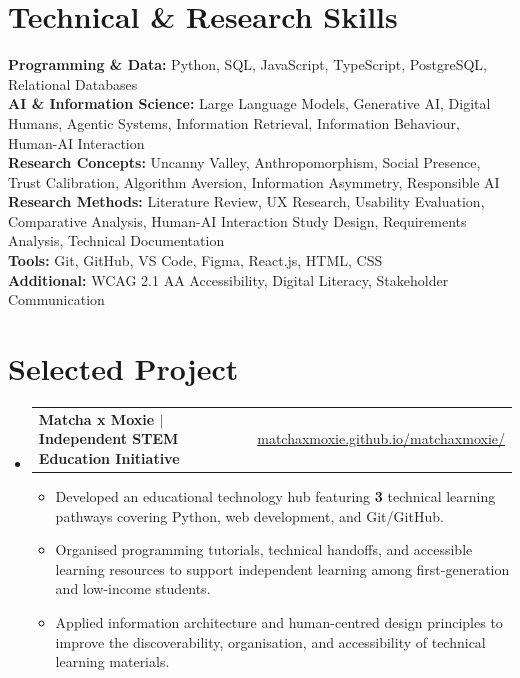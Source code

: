 \documentclass[letterpaper,10pt]{article}
\makeatletter
\newcommand{\resumeRole}[2]{%
  \item
    \begin{tabular*}{\textwidth}[t]{l@{\extracolsep{\fill}}r}
      \textbf{#1} & {#2} \\
    \end{tabular*}%
}
\newcommand{\resumeItem}[1]{\item{#1}}
\newcommand{\resumeSubHeadingListStart}{%
  \begin{itemize}[leftmargin=0pt, label={}, itemsep=1.1pt, parsep=0pt, topsep=0.3pt, partopsep=0pt]
}
\newcommand{\resumeSubHeadingListEnd}{\end{itemize}}
\newcommand{\resumeItemListStart}{%
  \begin{itemize}[leftmargin=0.28in, labelsep=4.96pt, labelindent=0.10in, itemindent=0pt, labelwidth=8pt, align=left, label=\textbullet, itemsep=0.15pt, parsep=0pt, topsep=0.15pt, partopsep=0pt]
  \fontsize{10}{10.4}\selectfont
}
\newcommand{\resumeItemListEnd}{\end{itemize}}
\newcommand{\skillline}[2]{\textbf{#1:} #2}
\makeatother
\begin{document}
\section{Technical \& Research Skills}
\skillline{Programming \& Data}{Python, SQL, JavaScript, TypeScript, PostgreSQL, Relational Databases}\\[0.5pt]
\skillline{AI \& Information Science}{Large Language Models, Generative AI, Digital Humans, Agentic Systems, Information Retrieval, Information Behaviour, Human-AI Interaction}\\[0.5pt]
\skillline{Research Concepts}{Uncanny Valley, Anthropomorphism, Social Presence, Trust Calibration, Algorithm Aversion, Information Asymmetry, Responsible AI}\\[0.5pt]
\skillline{Research Methods}{Literature Review, UX Research, Usability Evaluation, Comparative Analysis, Human-AI Interaction Study Design, Requirements Analysis, Technical Documentation}\\[0.5pt]
\skillline{Tools}{Git, GitHub, VS Code, Figma, React.js, HTML, CSS}\\[0.5pt]
\skillline{Additional}{WCAG 2.1 AA Accessibility, Digital Literacy, Stakeholder Communication}

\section{Selected Project}
\resumeSubHeadingListStart
  \resumeRole{Matcha x Moxie $\vert$ Independent STEM Education Initiative}{\href{https://matchaxmoxie.github.io/matchaxmoxie/}{matchaxmoxie.github.io/matchaxmoxie/}}
    \resumeItemListStart
      \resumeItem{Developed an educational technology hub featuring \textbf{3} technical learning pathways covering Python, web development, and Git/GitHub.}
      \resumeItem{Organised programming tutorials, technical handoffs, and accessible learning resources to support independent learning among first-generation and low-income students.}
      \resumeItem{Applied information architecture and human-centred design principles to improve the discoverability, organisation, and accessibility of technical learning materials.}
    \resumeItemListEnd
\resumeSubHeadingListEnd
\end{document}
